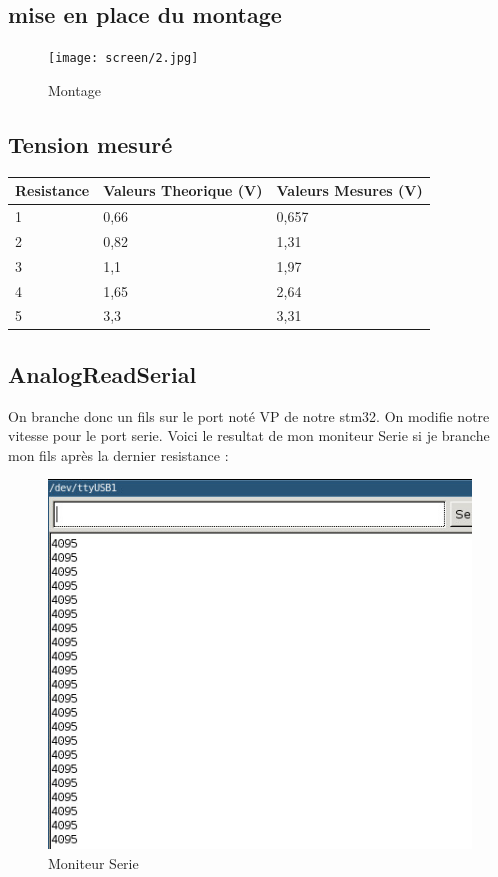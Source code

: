 \documentclass[10pt,a4paper]{article}
\begin{document}
\subsection{mise en place du montage}
\begin{figure}[h!]
\centering
\texttt{[image: screen/2.jpg]}
\caption{Montage}
\label{fig:net }
\end{figure}
\subsection{Tension mesuré}
\begin{tabular}{|l|l|l|}
\hline
    Resistance & Valeurs Theorique (V) & Valeurs Mesures (V)\\ \hline
    1 & 0,66 & 0,657\\ \hline
    2 & 0,82 & 1,31\\ \hline
    3 & 1,1 & 1,97\\ \hline
    4 & 1,65 & 2,64\\ \hline
    5 & 3,3 & 3,31\\ \hline
    
\hline
\end{tabular}
\subsection{AnalogReadSerial}
On branche donc un fils sur le port noté VP de notre stm32. On modifie notre vitesse pour le port serie. Voici le resultat de mon moniteur Serie si je branche mon fils après la dernier resistance :
\begin{figure}[h!]
\centering
\includegraphics[scale=0.50]{screen/3.jpg}
\caption{Moniteur Serie}
\label{fig:net }
\end{figure}
\end{document}
